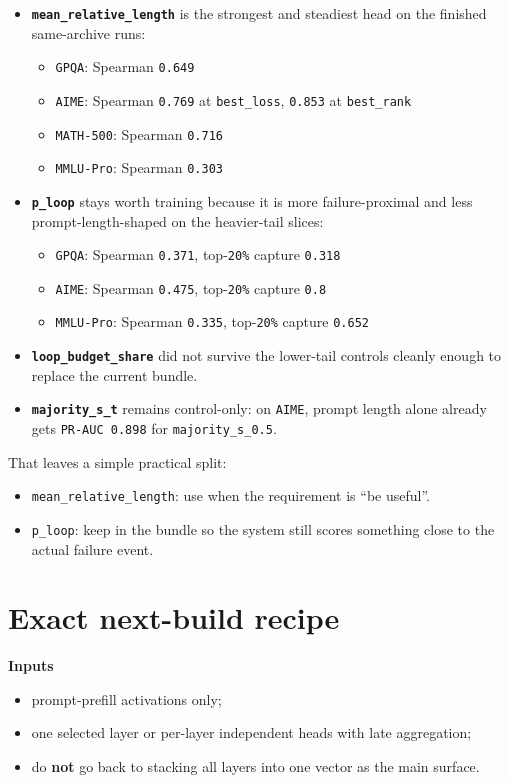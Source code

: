 \documentclass[11pt]{article}
\begin{document}
\begin{itemize}[leftmargin=1.5em]
\item \textbf{\texttt{mean\_relative\_length}} is the strongest and steadiest head on the
finished same-archive runs:
  \begin{itemize}[leftmargin=1.5em]
  \item \texttt{GPQA}: Spearman \texttt{0.649}
  \item \texttt{AIME}: Spearman \texttt{0.769} at \texttt{best\_loss}, \texttt{0.853} at \texttt{best\_rank}
  \item \texttt{MATH-500}: Spearman \texttt{0.716}
  \item \texttt{MMLU-Pro}: Spearman \texttt{0.303}
  \end{itemize}
\item \textbf{\texttt{p\_loop}} stays worth training because it is more failure-proximal and
less prompt-length-shaped on the heavier-tail slices:
  \begin{itemize}[leftmargin=1.5em]
  \item \texttt{GPQA}: Spearman \texttt{0.371}, top-\texttt{20\%} capture \texttt{0.318}
  \item \texttt{AIME}: Spearman \texttt{0.475}, top-\texttt{20\%} capture \texttt{0.8}
  \item \texttt{MMLU-Pro}: Spearman \texttt{0.335}, top-\texttt{20\%} capture \texttt{0.652}
  \end{itemize}
\item \textbf{\texttt{loop\_budget\_share}} did not survive the lower-tail controls cleanly
enough to replace the current bundle.
\item \textbf{\texttt{majority\_s\_t}} remains control-only: on \texttt{AIME}, prompt length
alone already gets \texttt{PR-AUC 0.898} for \texttt{majority\_s\_0.5}.
\end{itemize}

That leaves a simple practical split:
\begin{itemize}[leftmargin=1.5em]
\item \texttt{mean\_relative\_length}: use when the requirement is ``be useful''.
\item \texttt{p\_loop}: keep in the bundle so the system still scores something close to the
actual failure event.
\end{itemize}

\section*{Exact next-build recipe}
\textbf{Inputs}
\begin{itemize}[leftmargin=1.5em]
\item prompt-prefill activations only;
\item one selected layer or per-layer independent heads with late aggregation;
\item do \textbf{not} go back to stacking all layers into one vector as the main surface.
\end{itemize}
\end{document}
